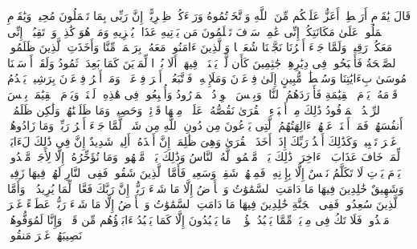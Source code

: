 \stopbuffer
\startbuffer[\q:11:92]
قَالَ یَٰقَوۡمِ أَرَهۡطِیۤ أَعَزُّ عَلَیۡكُم مِّنَ ٱللَّهِ وَٱتَّخَذۡتُمُوهُ وَرَاۤءَكُمۡ ظِهۡرِیًّاۖ إِنَّ رَبِّی بِمَا تَعۡمَلُونَ مُحِیطࣱ%
\stopbuffer
\startbuffer[\q:11:93]
وَیَٰقَوۡمِ ٱعۡمَلُوا۟ عَلَىٰ مَكَانَتِكُمۡ إِنِّی عَٰمِلࣱۖ سَوۡفَ تَعۡلَمُونَ مَن یَأۡتِیهِ عَذَابࣱ یُخۡزِیهِ وَمَنۡ هُوَ كَٰذِبࣱۖ وَٱرۡتَقِبُوۤا۟ إِنِّی مَعَكُمۡ رَقِیبࣱ%
\stopbuffer
\startbuffer[\q:11:94]
وَلَمَّا جَاۤءَ أَمۡرُنَا نَجَّیۡنَا شُعَیۡبࣰا وَٱلَّذِینَ ءَامَنُوا۟ مَعَهُۥ بِرَحۡمَةࣲ مِّنَّا وَأَخَذَتِ ٱلَّذِینَ ظَلَمُوا۟ ٱلصَّیۡحَةُ فَأَصۡبَحُوا۟ فِی دِیَٰرِهِمۡ جَٰثِمِینَ%
\stopbuffer
\startbuffer[\q:11:95]
كَأَن لَّمۡ یَغۡنَوۡا۟ فِیهَاۤۗ أَلَا بُعۡدࣰا لِّمَدۡیَنَ كَمَا بَعِدَتۡ ثَمُودُ%
\stopbuffer
\startbuffer[\q:11:96]
وَلَقَدۡ أَرۡسَلۡنَا مُوسَىٰ بِءَایَٰتِنَا وَسُلۡطَٰنࣲ مُّبِینٍ%
\stopbuffer
\startbuffer[\q:11:97]
إِلَىٰ فِرۡعَوۡنَ وَمَلَإِی۟هِۦ فَٱتَّبَعُوۤا۟ أَمۡرَ فِرۡعَوۡنَۖ وَمَاۤ أَمۡرُ فِرۡعَوۡنَ بِرَشِیدࣲ%
\stopbuffer
\startbuffer[\q:11:98]
یَقۡدُمُ قَوۡمَهُۥ یَوۡمَ ٱلۡقِیَٰمَةِ فَأَوۡرَدَهُمُ ٱلنَّارَۖ وَبِئۡسَ ٱلۡوِرۡدُ ٱلۡمَوۡرُودُ%
\stopbuffer
\startbuffer[\q:11:99]
وَأُتۡبِعُوا۟ فِی هَٰذِهِۦ لَعۡنَةࣰ وَیَوۡمَ ٱلۡقِیَٰمَةِۚ بِئۡسَ ٱلرِّفۡدُ ٱلۡمَرۡفُودُ%
\stopbuffer
\startbuffer[\q:11:100]
ذَٰلِكَ مِنۡ أَنۢبَاۤءِ ٱلۡقُرَىٰ نَقُصُّهُۥ عَلَیۡكَۖ مِنۡهَا قَاۤئِمࣱ وَحَصِیدࣱ%
\stopbuffer
\startbuffer[\q:11:101]
وَمَا ظَلَمۡنَٰهُمۡ وَلَٰكِن ظَلَمُوۤا۟ أَنفُسَهُمۡۖ فَمَاۤ أَغۡنَتۡ عَنۡهُمۡ ءَالِهَتُهُمُ ٱلَّتِی یَدۡعُونَ مِن دُونِ ٱللَّهِ مِن شَیۡءࣲ لَّمَّا جَاۤءَ أَمۡرُ رَبِّكَۖ وَمَا زَادُوهُمۡ غَیۡرَ تَتۡبِیبࣲ%
\stopbuffer
\startbuffer[\q:11:102]
وَكَذَٰلِكَ أَخۡذُ رَبِّكَ إِذَاۤ أَخَذَ ٱلۡقُرَىٰ وَهِیَ ظَٰلِمَةٌۚ إِنَّ أَخۡذَهُۥۤ أَلِیمࣱ شَدِیدٌ%
\stopbuffer
\startbuffer[\q:11:103]
إِنَّ فِی ذَٰلِكَ لَءَایَةࣰ لِّمَنۡ خَافَ عَذَابَ ٱلۡءَاخِرَةِۚ ذَٰلِكَ یَوۡمࣱ مَّجۡمُوعࣱ لَّهُ ٱلنَّاسُ وَذَٰلِكَ یَوۡمࣱ مَّشۡهُودࣱ%
\stopbuffer
\startbuffer[\q:11:104]
وَمَا نُؤَخِّرُهُۥۤ إِلَّا لِأَجَلࣲ مَّعۡدُودࣲ%
\stopbuffer
\startbuffer[\q:11:105]
یَوۡمَ یَأۡتِ لَا تَكَلَّمُ نَفۡسٌ إِلَّا بِإِذۡنِهِۦۚ فَمِنۡهُمۡ شَقِیࣱّ وَسَعِیدࣱ%
\stopbuffer
\startbuffer[\q:11:106]
فَأَمَّا ٱلَّذِینَ شَقُوا۟ فَفِی ٱلنَّارِ لَهُمۡ فِیهَا زَفِیرࣱ وَشَهِیقٌ%
\stopbuffer
\startbuffer[\q:11:107]
خَٰلِدِینَ فِیهَا مَا دَامَتِ ٱلسَّمَٰوَٰتُ وَٱلۡأَرۡضُ إِلَّا مَا شَاۤءَ رَبُّكَۚ إِنَّ رَبَّكَ فَعَّالࣱ لِّمَا یُرِیدُ%
\stopbuffer
\startbuffer[\q:11:108]
۞ وَأَمَّا ٱلَّذِینَ سُعِدُوا۟ فَفِی ٱلۡجَنَّةِ خَٰلِدِینَ فِیهَا مَا دَامَتِ ٱلسَّمَٰوَٰتُ وَٱلۡأَرۡضُ إِلَّا مَا شَاۤءَ رَبُّكَۖ عَطَاۤءً غَیۡرَ مَجۡذُوذࣲ%
\stopbuffer
\startbuffer[\q:11:109]
فَلَا تَكُ فِی مِرۡیَةࣲ مِّمَّا یَعۡبُدُ هَٰۤؤُلَاۤءِۚ مَا یَعۡبُدُونَ إِلَّا كَمَا یَعۡبُدُ ءَابَاۤؤُهُم مِّن قَبۡلُۚ وَإِنَّا لَمُوَفُّوهُمۡ نَصِیبَهُمۡ غَیۡرَ مَنقُوصࣲ%
